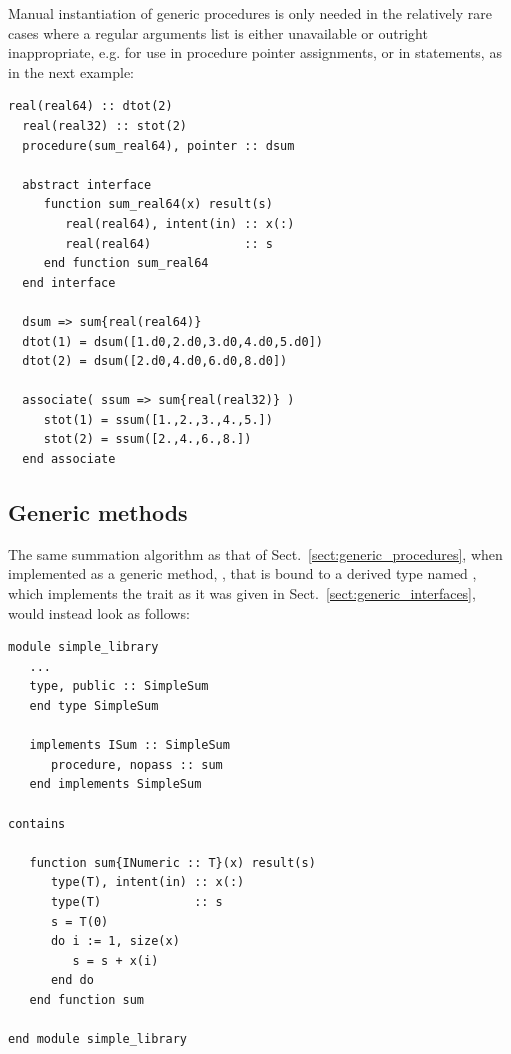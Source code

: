 \documentclass[11pt,oneside]{report}
\newcommand{\code}[1]{{\selectfont\ttfamily{#1}}}
\begin{document}
Manual instantiation of generic procedures is only needed in
the relatively rare cases where a regular arguments list is either
unavailable or outright inappropriate, e.g. for use in procedure
pointer assignments, or in \code{associate} statements, as in the next
example:
\begin{lstlisting}[language=LFortran,style=boxed]
  real(real64) :: dtot(2)
  real(real32) :: stot(2)
  procedure(sum_real64), pointer :: dsum

  abstract interface
     function sum_real64(x) result(s)
        real(real64), intent(in) :: x(:)
        real(real64)             :: s
     end function sum_real64  
  end interface
  
  dsum => sum{real(real64)}
  dtot(1) = dsum([1.d0,2.d0,3.d0,4.d0,5.d0])
  dtot(2) = dsum([2.d0,4.d0,6.d0,8.d0])

  associate( ssum => sum{real(real32)} )
     stot(1) = ssum([1.,2.,3.,4.,5.])
     stot(2) = ssum([2.,4.,6.,8.])     
  end associate
\end{lstlisting}

\subsection{Generic methods}
\label{sect:generic_methods}

The same summation algorithm as that of
Sect.~\ref{sect:generic_procedures}, when implemented as a generic
method, \code{sum}, that is bound to a derived type named
\code{SimpleSum}, which implements the trait \code{ISum} as it was
given in Sect.~\ref{sect:generic_interfaces}, would instead look as
follows:
\begin{lstlisting}[language=LFortran,style=boxed]
module simple_library
   ...
   type, public :: SimpleSum
   end type SimpleSum

   implements ISum :: SimpleSum
      procedure, nopass :: sum
   end implements SimpleSum
   
contains
   
   function sum{INumeric :: T}(x) result(s)
      type(T), intent(in) :: x(:)
      type(T)             :: s
      s = T(0)
      do i := 1, size(x)
         s = s + x(i)
      end do
   end function sum

end module simple_library
\end{lstlisting}
\end{document}
